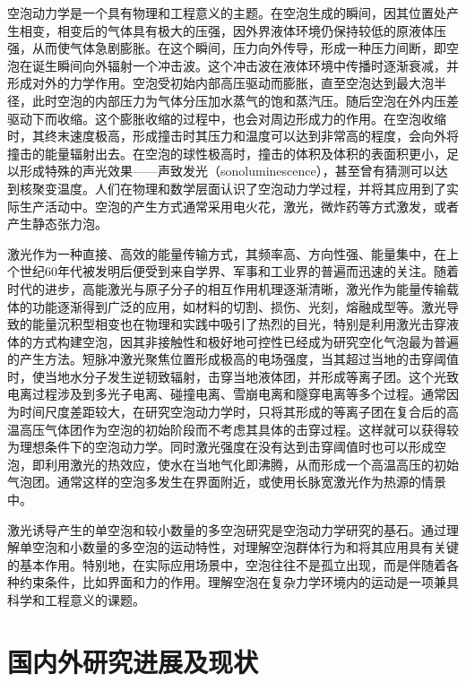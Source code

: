 空泡动力学是一个具有物理和工程意义的主题。在空泡生成的瞬间，因其位置处产生相变，相变后的气体具有极大的压强，因外界液体环境仍保持较低的原液体压强，从而使气体急剧膨胀。在这个瞬间，压力向外传导，形成一种压力间断，即空泡在诞生瞬间向外辐射一个冲击波。这个冲击波在液体环境中传播时逐渐衰减，并形成对外的力学作用。空泡受初始内部高压驱动而膨胀，直至空泡达到最大泡半径，此时空泡的内部压力为气体分压加水蒸气的饱和蒸汽压。随后空泡在外内压差驱动下而收缩。这个膨胀收缩的过程中，也会对周边形成力的作用。在空泡收缩时，其终末速度极高，形成撞击时其压力和温度可以达到非常高的程度，会向外将撞击的能量辐射出去。在空泡的球性极高时，撞击的体积及体积的表面积更小，足以形成特殊的声光效果——声致发光（sonoluminescence），甚至曾有猜测可以达到核聚变温度。人们在物理和数学层面认识了空泡动力学过程，并将其应用到了实际生产活动中\cite{Prosperetti2017}。空泡的产生方式通常采用电火花，激光，微炸药等方式激发，或者产生静态张力泡。


激光作为一种直接、高效的能量传输方式，其频率高、方向性强、能量集中，在上个世纪60年代被发明后便受到来自学界、军事和工业界的普遍而迅速的关注。随着时代的进步，高能激光与原子分子的相互作用机理逐渐清晰，激光作为能量传输载体的功能逐渐得到广泛的应用，如材料的切割、损伤、光刻，熔融成型等。激光导致的能量沉积型相变也在物理和实践中吸引了热烈的目光，特别是利用激光击穿液体的方式构建空泡，因其非接触性和极好地可控性已经成为研究空化气泡最为普遍的产生方法。短脉冲激光聚焦位置形成极高的电场强度，当其超过当地的击穿阈值时，使当地水分子发生逆韧致辐射，击穿当地液体团，并形成等离子团。这个光致电离过程涉及到多光子电离、碰撞电离、雪崩电离和隧穿电离等多个过程\cite{li__2022,__1996}。通常因为时间尺度差距较大，在研究空泡动力学时，只将其形成的等离子团在复合后的高温高压气体团作为空泡的初始阶段而不考虑其具体的击穿过程。这样就可以获得较为理想条件下的空泡动力学。同时激光强度在没有达到击穿阈值时也可以形成空泡，即利用激光的热效应，使水在当地气化即沸腾，从而形成一个高温高压的初始气泡团。通常这样的空泡多发生在界面附近，或使用长脉宽激光作为热源的情景中。

激光诱导产生的单空泡和较小数量的多空泡研究是空泡动力学研究的基石。通过理解单空泡和小数量的多空泡的运动特性，对理解空泡群体行为和将其应用具有关键的基本作用。特别地，在实际应用场景中，空泡往往不是孤立出现，而是伴随着各种约束条件，比如界面和力的作用。理解空泡在复杂力学环境内的运动是一项兼具科学和工程意义的课题。


\section{国内外研究进展及现状}



